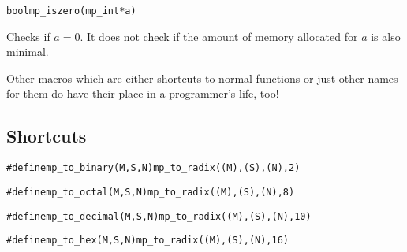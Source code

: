 \documentclass[synpaper]{book}
\begin{document}
\begin{alltt}
bool mp_iszero(mp_int *a)
\end{alltt}
Checks if $a = 0$. It does not check if the amount of memory allocated for $a$ is also minimal.

Other macros which are either shortcuts to normal functions or just other names for them do have
their place in a programmer's life, too!

\subsection{Shortcuts}

\begin{alltt}
#define mp_to_binary(M, S, N)  mp_to_radix((M), (S), (N), 2)
\end{alltt}

\begin{alltt}
#define mp_to_octal(M, S, N)   mp_to_radix((M), (S), (N), 8)
\end{alltt}

\begin{alltt}
#define mp_to_decimal(M, S, N) mp_to_radix((M), (S), (N), 10)
\end{alltt}

\begin{alltt}
#define mp_to_hex(M, S, N)     mp_to_radix((M), (S), (N), 16)
\end{alltt}
\end{document}
